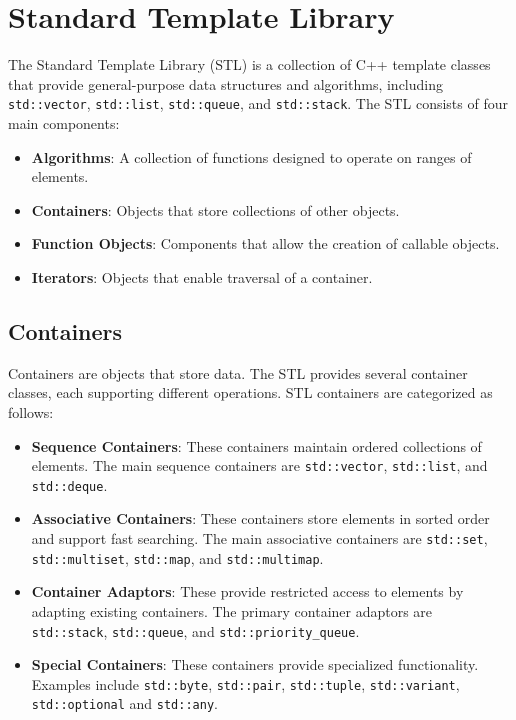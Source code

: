 \chapter{Standard Template Library}\label{ch:stl}

The Standard Template Library (STL) is a collection of C++ template classes that provide general-purpose data structures and algorithms, including \texttt{std::vector}, \texttt{std::list}, \texttt{std::queue}, and \texttt{std::stack}. The STL consists of four main components:

\begin{itemize}
    \item \textbf{Algorithms}: A collection of functions designed to operate on ranges of elements.
    \item \textbf{Containers}: Objects that store collections of other objects.
    \item \textbf{Function Objects}: Components that allow the creation of callable objects.
    \item \textbf{Iterators}: Objects that enable traversal of a container.
\end{itemize}

\section{Containers}

Containers are objects that store data. The STL provides several container classes, each supporting different operations. STL containers are categorized as follows:

\begin{itemize}
    \item \textbf{Sequence Containers}: These containers maintain ordered collections of elements. The main sequence containers are \texttt{std::vector}, \texttt{std::list}, and \texttt{std::deque}.
    \item \textbf{Associative Containers}: These containers store elements in sorted order and support fast searching. The main associative containers are \texttt{std::set}, \texttt{std::multiset}, \texttt{std::map}, and \texttt{std::multimap}.
    \item \textbf{Container Adaptors}: These provide restricted access to elements by adapting existing containers. The primary container adaptors are \texttt{std::stack}, \texttt{std::queue}, and \texttt{std::priority\_queue}.
    \item \textbf{Special Containers}: These containers provide specialized functionality. Examples include \texttt{std::byte}, \texttt{std::pair}, \texttt{std::tuple}, \texttt{std::variant}, \texttt{std::optional} and \texttt{std::any}.
\end{itemize}

